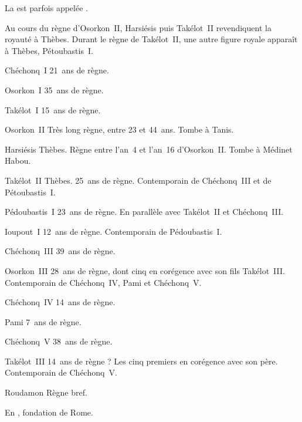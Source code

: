 La  est parfois appelée  .

Au cours du règne d’Osorkon~II, Harsiésis puis Takélot~II revendiquent 
la royauté à Thèbes. Durant le règne de Takélot~II, une autre figure 
royale apparaît à Thèbes, Pétoubastis~I\ier. 


\begin{listerois}
  \item [\XIIA{} Chéchonq~I\ier] \num{21}~ans de règne.
  \item [\XIIA{} Osorkon~I\ier] \num{35}~ans de règne.
  \item [\XIIA{} Takélot~I\ier] \num{15}~ans de règne.
  \item [\XIIA{} Osorkon~II] Très long règne, entre \num{23} et 
        \num{44}~ans. Tombe à Tanis.
  \item [\XIIB{} Harsiésis] Thèbes. Règne entre l'an~\num{4} et 
        l'an~\num{16} d'Osorkon~II. Tombe à Médinet Habou.
  \item [\XIIB{} Takélot~II] Thèbes. \num{25}~ans de règne. 
        Contemporain de Chéchonq~III et de Pétoubastis~I\ier.
  \item [\XIIC{} Pédoubastis~I\ier] \num{23}~ans de règne. 
        En parallèle avec \XIIB Takélot~II et \XIIA Chéchonq~III.
  \item [\XIIC{} Ioupout~I\ier] \num{12}~ans de règne. Contemporain de 
        Pédoubastis~I\ier.
  \item [\XIIA{} Chéchonq~III] \num{39}~ans de règne.
  \item [\XIIB{} Osorkon~III] \num{28}~ans de règne, dont cinq en 
        corégence avec son fils Takélot~III. 
        Contemporain de Chéchonq~IV, Pami et Chéchonq~V.
  \item [\XIIA{} Chéchonq~IV] \num{14}~ans de règne.
  \item [\XIIA{} Pami] \num{7}~ans de règne.
  \item [\XIIA{} Chéchonq~V] \num{38}~ans de règne.
  \item [\XIIB{} Takélot~III] \num{14}~ans de règne ? Les cinq 
        premiers en corégence avec son père. 
        Contemporain de Chéchonq~V.
  \item [\XIIB{} Roudamon] Règne bref.
\end{listerois}

En , fondation de Rome.

